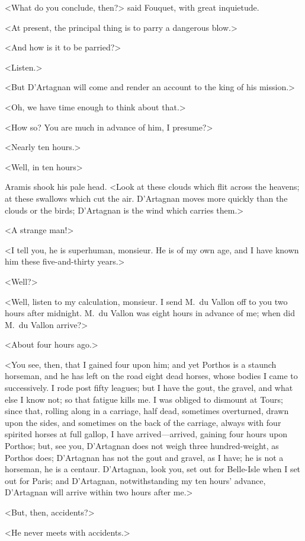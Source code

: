 <What do you conclude, then?> said Fouquet, with great inquietude.

<At present, the principal thing is to parry a dangerous blow.>

<And how is it to be parried?>

<Listen.>

<But D'Artagnan will come and render an account to the king of his mission.>

<Oh, we have time enough to think about that.>

<How so? You are much in advance of him, I presume?>

<Nearly ten hours.>

<Well, in ten hours\longdash>

Aramis shook his pale head. <Look at these clouds which flit across the heavens; at these swallows which cut the air. D'Artagnan moves more quickly than the clouds or the birds; D'Artagnan is the wind which carries them.>

<A strange man!>

<I tell you, he is superhuman, monsieur. He is of my own age, and I have known him these five-and-thirty years.>

<Well?>

<Well, listen to my calculation, monsieur. I send M.~du Vallon off to you two hours after midnight. M.~du Vallon was eight hours in advance of me; when did M.~du Vallon arrive?>

<About four hours ago.>

<You see, then, that I gained four upon him; and yet Porthos is a staunch horseman, and he has left on the road eight dead horses, whose bodies I came to successively. I rode post fifty leagues; but I have the gout, the gravel, and what else I know not; so that fatigue kills me. I was obliged to dismount at Tours; since that, rolling along in a carriage, half dead, sometimes overturned, drawn upon the sides, and sometimes on the back of the carriage, always with four spirited horses at full gallop, I have arrived—arrived, gaining four hours upon Porthos; but, see you, D'Artagnan does not weigh three hundred-weight, as Porthos does; D'Artagnan has not the gout and gravel, as I have; he is not a horseman, he is a centaur. D'Artagnan, look you, set out for Belle-Isle when I set out for Paris; and D'Artagnan, notwithstanding my ten hours' advance, D'Artagnan will arrive within two hours after me.>

<But, then, accidents?>

<He never meets with accidents.>

